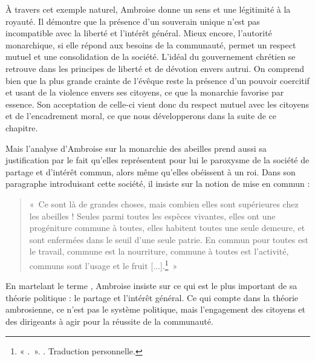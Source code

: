 \bigskip

À travers cet exemple naturel, Ambroise donne un sens et une légitimité à la royauté. Il démontre que la présence d'un souverain unique n'est pas incompatible avec la liberté et l'intérêt général. Mieux encore, l'autorité monarchique, si elle répond aux besoins de la communauté, permet un respect mutuel et une consolidation de la société. L'idéal du gouvernement chrétien se retrouve dans les principes de liberté et de dévotion envers autrui. On comprend bien que la plus grande crainte de l'évêque reste la présence d'un pouvoir coercitif et usant de la violence envers ses citoyens, ce que la monarchie favorise par essence. Son acceptation de celle-ci vient donc du respect mutuel avec les citoyens et de l'encadrement moral, ce que nous développerons dans la suite de ce chapitre.

\bigskip

Mais l'analyse d'Ambroise sur la monarchie des abeilles prend aussi sa justification par le fait qu'elles représentent pour lui le paroxysme de la société de partage et d'intérêt commun, alors même qu'elles obéissent à un roi. Dans son paragraphe introduisant cette société, il insiste sur la notion de mise en commun :

\bigskip

\begin{quote}
    «~Ce sont là de grandes choses, mais combien elles sont supérieures chez les abeilles ! Seules parmi toutes les espèces vivantes, elles ont une progéniture commune à toutes, elles habitent toutes une seule demeure, et sont enfermées dans le seuil d'une seule patrie. En commun pour toutes est le travail, commune est la nourriture, commune à toutes est l'activité, communs sont l'usage et le fruit [...].\footnote{« .~». \cite[\nopp V, 21, 67]{ambroise_csel_32_1}. Traduction personnelle.}~»
\end{quote}

\bigskip

En martelant le terme , Ambroise insiste sur ce qui est le plus important de sa théorie politique : le partage et l'intérêt général. Ce qui compte dans la théorie ambrosienne, ce n'est pas le système politique, mais l'engagement des citoyens et des dirigeants à agir pour la réussite de la communauté.

